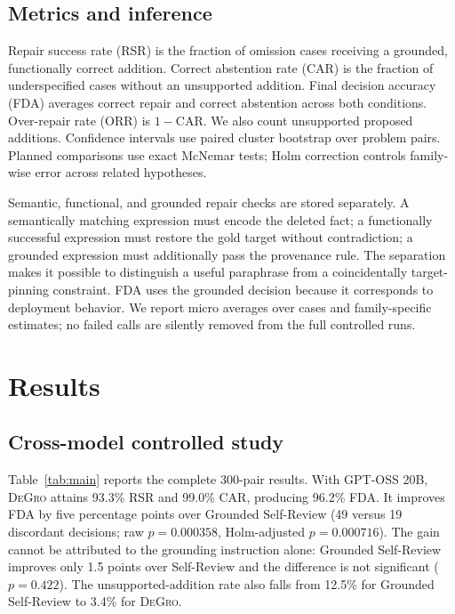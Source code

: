 \documentclass[sigconf,anonymous]{aamas}
\newcommand{\method}{\textsc{DeGro}}
\begin{document}
\subsection{Metrics and inference}
Repair success rate (RSR) is the fraction of omission cases receiving a grounded, functionally correct addition.  Correct abstention rate (CAR) is the fraction of underspecified cases without an unsupported addition.  Final decision accuracy (FDA) averages correct repair and correct abstention across both conditions.  Over-repair rate (ORR) is $1-\mathrm{CAR}$.  We also count unsupported proposed additions.  Confidence intervals use paired cluster bootstrap over problem pairs.  Planned comparisons use exact McNemar tests; Holm correction controls family-wise error across related hypotheses.

Semantic, functional, and grounded repair checks are stored separately.  A semantically matching expression must encode the deleted fact; a functionally successful expression must restore the gold target without contradiction; a grounded expression must additionally pass the provenance rule.  The separation makes it possible to distinguish a useful paraphrase from a coincidentally target-pinning constraint.  FDA uses the grounded decision because it corresponds to deployment behavior.  We report micro averages over cases and family-specific estimates; no failed calls are silently removed from the full controlled runs.

\section{Results}
\subsection{Cross-model controlled study}
Table~\ref{tab:main} reports the complete 300-pair results.  With GPT-OSS 20B, \method{} attains 93.3\% RSR and 99.0\% CAR, producing 96.2\% FDA.  It improves FDA by five percentage points over Grounded Self-Review (49 versus 19 discordant decisions; raw $p=0.000358$, Holm-adjusted $p=0.000716$).  The gain cannot be attributed to the grounding instruction alone: Grounded Self-Review improves only 1.5 points over Self-Review and the difference is not significant ($p=0.422$).  The unsupported-addition rate also falls from 12.5\% for Grounded Self-Review to 3.4\% for \method{}.
\end{document}
